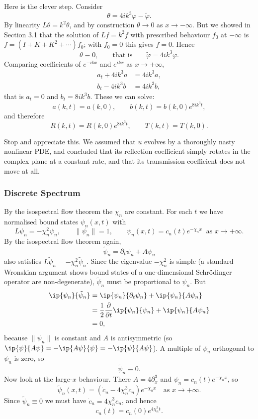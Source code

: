 Here is the clever step. Consider
$$
\theta = 4ik^3\varphi - \tilde\varphi.
$$
By linearity $L\theta = k^2\theta$, and by construction $\theta\to 0$ as $x\to-\infty$. But we showed in Section 3.1 that the solution of $Lf = k^2f$ with prescribed behaviour $f_0$ at $-\infty$ is $f = (I + K + K^2+\cdots)f_0$; with $f_0 = 0$ this gives $f = 0$. Hence
$$
\theta \equiv 0, \qquad\text{that is}\qquad \tilde\varphi = 4ik^3\varphi.
$$
Comparing coefficients of $e^{-ikx}$ and $e^{ikx}$ as $x\to+\infty$,
\begin{align*}
	a_t + 4ik^3a &= 4ik^3a,\\
	b_t - 4ik^3b &= 4ik^3b,
\end{align*}
that is $a_t = 0$ and $b_t = 8ik^3b$. These we can solve:
$$
a(k,t) = a(k,0), \qquad b(k,t) = b(k,0)e^{8ik^3t},
$$
and therefore
$$
\boxed{R(k,t) = R(k,0)e^{8ik^3t}, \qquad T(k,t) = T(k,0).}
$$

Stop and appreciate this. We assumed that $u$ evolves by a thoroughly nasty nonlinear PDE, and concluded that its reflection coefficient simply rotates in the complex plane at a constant rate, and that its transmission coefficient does not move at all.

\subsubsection{Discrete Spectrum}

By the isospectral flow theorem the $\chi_n$ are constant. For each $t$ we have normalised bound states $\psi_n(x,t)$ with
$$
L\psi_n = -\chi_n^2\psi_n, \qquad \|\psi_n\| = 1, \qquad \psi_n(x,t) = c_n(t)e^{-\chi_n x}\ \text{ as } x\to+\infty.
$$
By the isospectral flow theorem again,
$$
\tilde\psi_n = \partial_t\psi_n + A\psi_n
$$
also satisfies $L\tilde\psi_n = -\chi_n^2\tilde\psi_n$. Since the eigenvalue $-\chi_n^2$ is simple (a standard Wronskian argument shows bound states of a one-dimensional Schr\"odinger operator are non-degenerate), $\tilde\psi_n$ must be proportional to $\psi_n$. But
\begin{align*}
	\ip{\psi_n}{\tilde\psi_n} &= \ip{\psi_n}{\partial_t\psi_n} + \ip{\psi_n}{A\psi_n}\\
	&= \frac{1}{2}\frac{\partial}{\partial t}\ip{\psi_n}{\psi_n} + \ip{\psi_n}{A\psi_n}\\
	&= 0,
\end{align*}
because $\|\psi_n\|$ is constant and $A$ is antisymmetric (so $\ip{\psi}{A\psi} = -\ip{A\psi}{\psi} = -\ip{\psi}{A\psi}$). A multiple of $\psi_n$ orthogonal to $\psi_n$ is zero, so
$$
\tilde\psi_n \equiv 0.
$$
Now look at the large-$x$ behaviour. There $A = 4\partial_x^3$ and $\psi_n = c_n(t)e^{-\chi_nx}$, so
$$
\tilde\psi_n(x,t) = \left(\dot c_n - 4\chi_n^3c_n\right)e^{-\chi_nx}\quad\text{as }x\to+\infty.
$$
Since $\tilde\psi_n\equiv 0$ we must have $\dot c_n = 4\chi_n^3c_n$, and hence
$$
\boxed{c_n(t) = c_n(0)e^{4\chi_n^3t}.}
$$

